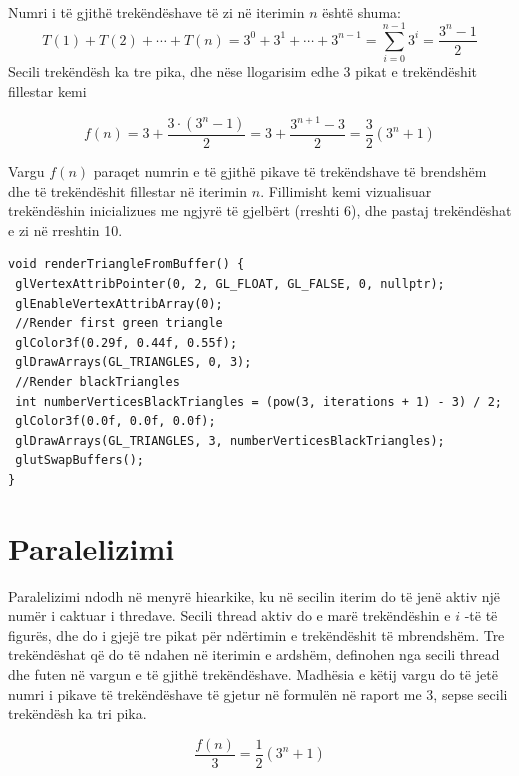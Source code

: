 \noindent \\ Numri i të gjithë trekëndëshave të zi në iterimin \(n\)  është shuma:
\[
T(1) + T(2) + \cdots + T(n) = 3^0 + 3^1 + \cdots + 3^{n-1} = \sum_{i=0}^{n-1} 3^i = \frac{3^n - 1}{2}
\]
\noindent Secili trekëndësh ka tre pika, dhe nëse llogarisim edhe 3 pikat e trekëndëshit fillestar kemi

\[
f(n) = 3 + \frac{3 \cdot (3^n - 1)}{2} = 3 + \frac{3^{n+1} - 3}{2} = \frac{3}{2} (3^n + 1)
\]

\noindent  Vargu \(f(n)\) paraqet numrin e të gjithë pikave të trekëndshave të brendshëm dhe të trekëndëshit fillestar në iterimin \(n\). Fillimisht kemi vizualisuar trekëndëshin inicializues me ngjyrë të gjelbërt (rreshti 6), dhe pastaj trekëndëshat e zi në rreshtin 10. \\ 

\begin{lstlisting}
void renderTriangleFromBuffer() {
 glVertexAttribPointer(0, 2, GL_FLOAT, GL_FALSE, 0, nullptr);
 glEnableVertexAttribArray(0);
 //Render first green triangle
 glColor3f(0.29f, 0.44f, 0.55f);
 glDrawArrays(GL_TRIANGLES, 0, 3);
 //Render blackTriangles
 int numberVerticesBlackTriangles = (pow(3, iterations + 1) - 3) / 2;
 glColor3f(0.0f, 0.0f, 0.0f);
 glDrawArrays(GL_TRIANGLES, 3, numberVerticesBlackTriangles);
 glutSwapBuffers();
} 
\end{lstlisting}


\section{Paralelizimi}

Paralelizimi ndodh në menyrë hiearkike, ku në secilin iterim do të jenë aktiv një numër i caktuar i thredave. Secili thread aktiv do e marë trekëndëshin e \(i\) -të të figurës, dhe do i gjejë tre pikat për ndërtimin e trekëndëshit të mbrendshëm. Tre trekëndëshat që do të ndahen në iterimin e ardshëm, definohen nga secili thread dhe futen në vargun e të gjithë trekëndëshave. Madhësia e këtij vargu do të jetë numri i pikave të trekëndëshave të gjetur në formulën në raport me 3, sepse secili trekëndësh ka tri pika.

\[
\frac{f(n)}{3} = \frac{1}{2} (3^n + 1)
\]



